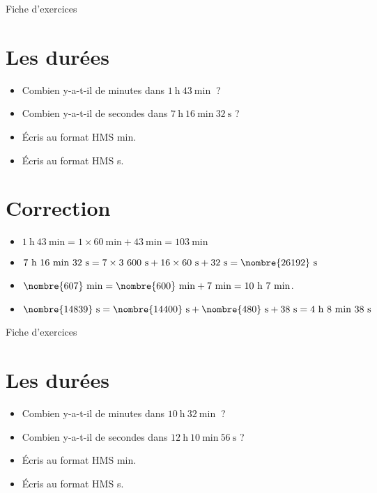 \documentclass[a4paper,11pt,fleqn]{article}
\begin{document}
\newpage
\setcounter{exo}{0}
\setcounter{section}{0}
\begin{center}
	{\huge Fiche d'exercices } 	
\end{center}


\section{Les durées}
\begin{itemize}
  \item Combien y-a-t-il de minutes dans $1~\text{h}~43~\text{min}~$ ?
  \item Combien y-a-t-il de secondes dans $7~\text{h}~16~\text{min}~32~\text{s}$ ?
  \item Écris au format HMS  min.
  \item Écris au format HMS  s.
\end{itemize}

\section{Correction}
\begin{itemize}
 \item $1~\text{h}~43~\text{min}=1\times60~\text{min}+43~\text{min}=103~\text{min}$
  \item $7~\text{h}~16~\text{min}~32~\text{s}=7\times3~600~\text{s}+16\times60~\text{s}+32~\text{s}=\nombre{26192}~\text{s}$
  \item $\nombre{607}~\text{min}=\nombre{600}~\text{min}+7~\text{min}=10~\text{h}~7~\text{min}$.
  \item $\nombre{14839}~\text{s}=\nombre{14400}~\text{s}+\nombre{480}~\text{s}+38~\text{s}=4~\text{h}~8~\text{min}~38~\text{s}$ \end{itemize}


\newpage
\setcounter{exo}{0}
\setcounter{section}{0}
\begin{center}
	{\huge Fiche d'exercices } 	
\end{center}


\section{Les durées}
\begin{itemize}
  \item Combien y-a-t-il de minutes dans $10~\text{h}~32~\text{min}~$ ?
  \item Combien y-a-t-il de secondes dans $12~\text{h}~10~\text{min}~56~\text{s}$ ?
  \item Écris au format HMS  min.
  \item Écris au format HMS  s.
\end{itemize}
\end{document}
